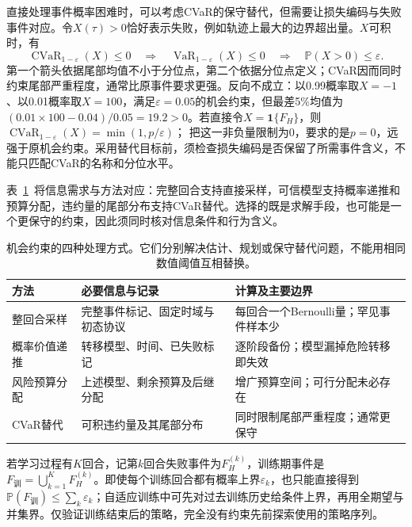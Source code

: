 直接处理事件概率困难时，可以考虑CVaR的保守替代，但需要让损失编码与失败事件对应。令$X(\tau)>0$恰好表示失败，例如轨迹上最大的边界超出量。$X$可积时，有
\[
  \operatorname{CVaR}_{1-\varepsilon}(X)\leq0
  \quad\Longrightarrow\quad
  \operatorname{VaR}_{1-\varepsilon}(X)\leq0
  \quad\Longrightarrow\quad
  \mathbb P(X>0)\leq\varepsilon.
\]
第一个箭头依据尾部均值不小于分位点，第二个依据分位点定义；CVaR因而同时约束尾部严重程度，通常比原事件要求更强。反向不成立：以0.99概率取$X=-1$、以0.01概率取$X=100$，满足$\varepsilon=0.05$的机会约束，但最差5\%均值为
$(0.01\times100-0.04)/0.05=19.2>0$。若直接令$X=\mathbf1\{F_H\}$，则
$\operatorname{CVaR}_{1-\varepsilon}(X)=\min(1,p/\varepsilon)$；
把这一非负量限制为0，要求的是$p=0$，远强于原机会约束。采用替代目标前，须检查损失编码是否保留了所需事件含义，不能只匹配CVaR的名称和分位水平。

表~\ref{tab:rl-trustworthy-chance-methods}~将信息需求与方法对应：完整回合支持直接采样，可信模型支持概率递推和预算分配，违约量的尾部分布支持CVaR替代。选择的既是求解手段，也可能是一个更保守的约束，因此须同时核对信息条件和行为含义。

\begin{table}[htbp]
  \centering
  \begin{tabularx}{\linewidth}{@{}>{\raggedright\arraybackslash}p{21mm}XX@{}}
    \toprule
    方法 & 必要信息与记录 & 计算及主要边界 \\
    \midrule
    整回合采样 & 完整事件标记、固定时域与初态协议 & 每回合一个Bernoulli量；罕见事件样本少 \\
    概率价值递推 & 转移模型、时间、已失败标记 & 逐阶段备份；模型漏掉危险转移即失效 \\
    风险预算分配 & 上述模型、剩余预算及后继分配 & 增广预算空间；可行分配未必存在 \\
    CVaR替代 & 可积违约量及其尾部分布 & 同时限制尾部严重程度；通常更保守 \\
    \bottomrule
  \end{tabularx}
  \caption{机会约束的四种处理方式。它们分别解决估计、规划或保守替代问题，不能用相同数值阈值互相替换。}
  \label{tab:rl-trustworthy-chance-methods}
\end{table}

若学习过程有$K$回合，记第$k$回合失败事件为$F_H^{(k)}$，训练期事件是
$F_{\text{训}}=\bigcup_{k=1}^KF_H^{(k)}$。即使每个训练回合都有概率上界$\varepsilon_k$，也只能直接得到
$\mathbb P(F_{\text{训}})\leq\sum_k\varepsilon_k$；自适应训练中可先对过去训练历史给条件上界，再用全期望与并集界。仅验证训练结束后的策略，完全没有约束先前探索使用的策略序列。

